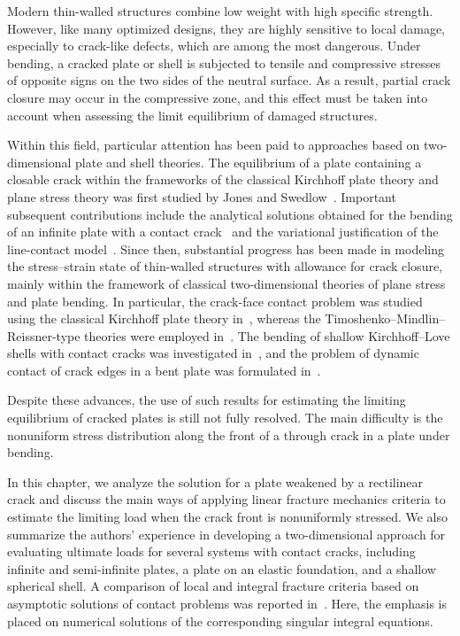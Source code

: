 Modern thin-walled structures combine low weight with high specific strength. However, like many optimized designs, they are highly sensitive to local damage, especially to crack-like defects, which are among the most dangerous. Under bending, a cracked plate or shell is subjected to tensile and compressive stresses of opposite signs on the two sides of the neutral surface. As a result, partial crack closure may occur in the compressive zone, and this effect must be taken into account when assessing the limit equilibrium of damaged structures.

Within this field, particular attention has been paid to approaches based on two-dimensional plate and shell theories. The equilibrium of a plate containing a closable crack within the frameworks of the classical Kirchhoff plate theory and plane stress theory was first studied by Jones and Swedlow~\cite{Shatskyi1}. Important subsequent contributions include the analytical solutions obtained for the bending of an infinite plate with a contact crack~\cite{Shatskyi2,Shatskyi3} and the variational justification of the line-contact model~\cite{Shatskyi4}. Since then, substantial progress has been made in modeling the stress--strain state of thin-walled structures with allowance for crack closure, mainly within the framework of classical two-dimensional theories of plane stress and plate bending. In particular, the crack-face contact problem was studied using the classical Kirchhoff plate theory in~\cite{Shatskyi5,Shatskyi6,Shatskyi7,Shatskyi8,Shatskyi9,Shatskyi10}, whereas the Timoshenko--Mindlin--Reissner-type theories were employed in~\cite{Shatskyi11,Shatskyi12,Shatskyi13,Shatskyi14}. The bending of shallow Kirchhoff--Love shells with contact cracks was investigated in~\cite{Shatskyi15,Shatskyi16,Shatskyi17,Shatskyi18}, and the problem of dynamic contact of crack edges in a bent plate was formulated in~\cite{Shatskyi19}.

Despite these advances, the use of such results for estimating the limiting equilibrium of cracked plates is still not fully resolved. The main difficulty is the nonuniform stress distribution along the front of a through crack in a plate under bending.

In this chapter, we analyze the solution for a plate weakened by a rectilinear crack and discuss the main ways of applying linear fracture mechanics criteria to estimate the limiting load when the crack front is nonuniformly stressed. We also summarize the authors' experience in developing a two-dimensional approach for evaluating ultimate loads for several systems with contact cracks, including infinite and semi-infinite plates, a plate on an elastic foundation, and a shallow spherical shell. A comparison of local and integral fracture criteria based on asymptotic solutions of contact problems was reported in~\cite{Shatskyi20}. Here, the emphasis is placed on numerical solutions of the corresponding singular integral equations.

